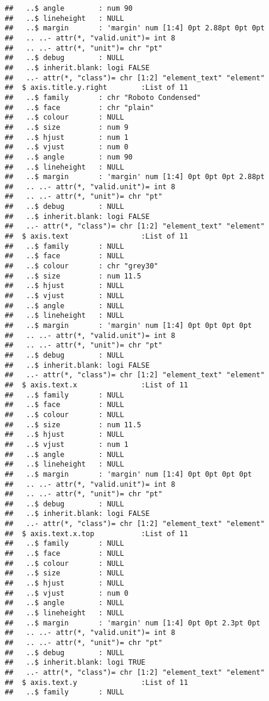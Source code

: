 \documentclass[
]{article}
\begin{document}
\begin{verbatim}
##   ..$ angle        : num 90
##   ..$ lineheight   : NULL
##   ..$ margin       : 'margin' num [1:4] 0pt 2.88pt 0pt 0pt
##   .. ..- attr(*, "valid.unit")= int 8
##   .. ..- attr(*, "unit")= chr "pt"
##   ..$ debug        : NULL
##   ..$ inherit.blank: logi FALSE
##   ..- attr(*, "class")= chr [1:2] "element_text" "element"
##  $ axis.title.y.right        :List of 11
##   ..$ family       : chr "Roboto Condensed"
##   ..$ face         : chr "plain"
##   ..$ colour       : NULL
##   ..$ size         : num 9
##   ..$ hjust        : num 1
##   ..$ vjust        : num 0
##   ..$ angle        : num 90
##   ..$ lineheight   : NULL
##   ..$ margin       : 'margin' num [1:4] 0pt 0pt 0pt 2.88pt
##   .. ..- attr(*, "valid.unit")= int 8
##   .. ..- attr(*, "unit")= chr "pt"
##   ..$ debug        : NULL
##   ..$ inherit.blank: logi FALSE
##   ..- attr(*, "class")= chr [1:2] "element_text" "element"
##  $ axis.text                 :List of 11
##   ..$ family       : NULL
##   ..$ face         : NULL
##   ..$ colour       : chr "grey30"
##   ..$ size         : num 11.5
##   ..$ hjust        : NULL
##   ..$ vjust        : NULL
##   ..$ angle        : NULL
##   ..$ lineheight   : NULL
##   ..$ margin       : 'margin' num [1:4] 0pt 0pt 0pt 0pt
##   .. ..- attr(*, "valid.unit")= int 8
##   .. ..- attr(*, "unit")= chr "pt"
##   ..$ debug        : NULL
##   ..$ inherit.blank: logi FALSE
##   ..- attr(*, "class")= chr [1:2] "element_text" "element"
##  $ axis.text.x               :List of 11
##   ..$ family       : NULL
##   ..$ face         : NULL
##   ..$ colour       : NULL
##   ..$ size         : num 11.5
##   ..$ hjust        : NULL
##   ..$ vjust        : num 1
##   ..$ angle        : NULL
##   ..$ lineheight   : NULL
##   ..$ margin       : 'margin' num [1:4] 0pt 0pt 0pt 0pt
##   .. ..- attr(*, "valid.unit")= int 8
##   .. ..- attr(*, "unit")= chr "pt"
##   ..$ debug        : NULL
##   ..$ inherit.blank: logi FALSE
##   ..- attr(*, "class")= chr [1:2] "element_text" "element"
##  $ axis.text.x.top           :List of 11
##   ..$ family       : NULL
##   ..$ face         : NULL
##   ..$ colour       : NULL
##   ..$ size         : NULL
##   ..$ hjust        : NULL
##   ..$ vjust        : num 0
##   ..$ angle        : NULL
##   ..$ lineheight   : NULL
##   ..$ margin       : 'margin' num [1:4] 0pt 0pt 2.3pt 0pt
##   .. ..- attr(*, "valid.unit")= int 8
##   .. ..- attr(*, "unit")= chr "pt"
##   ..$ debug        : NULL
##   ..$ inherit.blank: logi TRUE
##   ..- attr(*, "class")= chr [1:2] "element_text" "element"
##  $ axis.text.y               :List of 11
##   ..$ family       : NULL

\end{verbatim}
\end{document}
